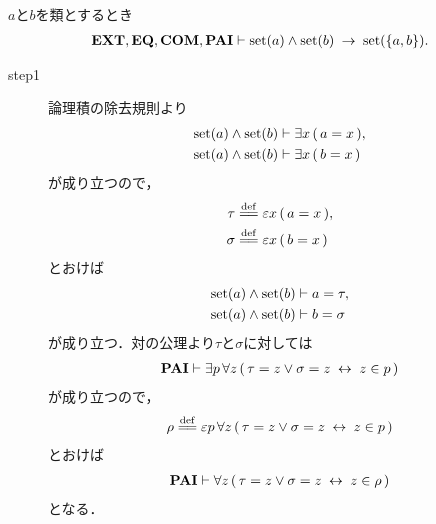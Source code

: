 	\begin{screen}
		\begin{thm}[集合の対は集合である]
		\label{thm:pair_of_sets_is_a_set}
			$a$と$b$を類とするとき
			\begin{align}
				\mbox{{\bf EXT}},\mbox{{\bf EQ}},\mbox{\bf COM},\mbox{{\bf PAI}} \vdash 
				\operatorname*{set} (a) \wedge \operatorname*{set} (b) \hspace{0.25em}\rightarrow\hspace{0.25em} \operatorname*{set} (\{a,b\}).
			\end{align}
		\end{thm}
	\end{screen}
	
	\begin{sketch}\mbox{}
		\begin{description}
			\item[step1]
				論理積の除去規則より
				\begin{align}
					\operatorname*{set} (a) \wedge \operatorname*{set} (b) &\vdash \exists x\, (\, a = x\, ), \\
					\operatorname*{set} (a) \wedge \operatorname*{set} (b) &\vdash \exists x\, (\, b = x\, )
				\end{align}
				が成り立つので，
				\begin{align}
					\tau &\defeq \varepsilon x\, (\, a = x\, ), \\
					\sigma &\defeq \varepsilon x\, (\, b = x\, )
				\end{align}
				とおけば
				\begin{align}
					\operatorname*{set} (a) \wedge \operatorname*{set} (b) &\vdash a = \tau, 
					\label{fom:pair_of_sets_is_a_set_1} \\
					\operatorname*{set} (a) \wedge \operatorname*{set} (b) &\vdash b = \sigma
				\end{align}
				が成り立つ．対の公理より$\tau$と$\sigma$に対しては
				\begin{align}
					\mbox{{\bf PAI}} \vdash \exists p\, \forall z\, 
						(\, \tau = z \vee \sigma = z \hspace{0.25em}\leftrightarrow\hspace{0.25em} z \in p\, )
				\end{align}
				が成り立つので，
				\begin{align}
					\rho \defeq \varepsilon p\, \forall z\, 
						(\, \tau = z \vee \sigma = z \lrarrow z \in p\, )
				\end{align}
				とおけば
				\begin{align}
					\mbox{{\bf PAI}} \vdash \forall z\, (\, \tau = z \vee \sigma = z \hspace{0.25em}\leftrightarrow\hspace{0.25em} z \in \rho\, )
					\label{fom:pair_of_sets_is_a_set_2}
				\end{align}
				となる．
				

\end{description}
\end{sketch}
